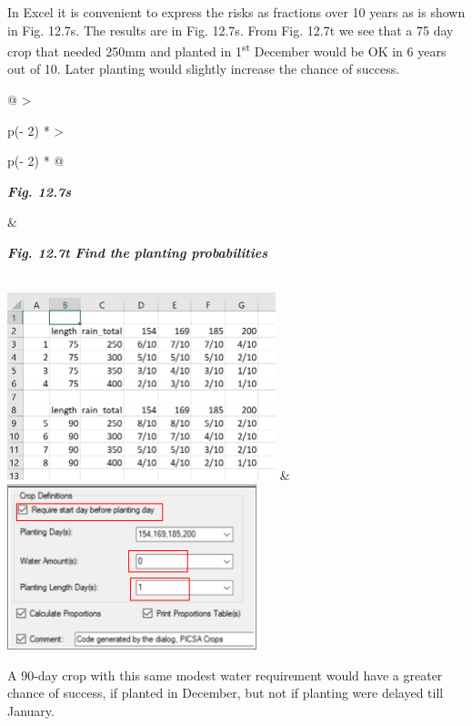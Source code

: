 \documentclass[
  letterpaper,
  DIV=11,
  numbers=noendperiod]{scrreprt}
\begin{document}
In Excel it is convenient to express the risks as fractions over 10
years as is shown in Fig. 12.7s. The results are in Fig. 12.7s. From
Fig. 12.7t we see that a 75 day crop that needed 250mm and planted in
1\textsuperscript{st} December would be OK in 6 years out of 10. Later
planting would slightly increase the chance of success.

\begin{longtable}[]{@{}
  >{\raggedright\arraybackslash}p{(\columnwidth - 2\tabcolsep) * }
  >{\raggedright\arraybackslash}p{(\columnwidth - 2\tabcolsep) * }@{}}
\toprule\noalign{}
\begin{minipage}[b]{\linewidth}\raggedright
\textbf{\emph{Fig. 12.7s}}
\end{minipage} & \begin{minipage}[b]{\linewidth}\raggedright
\textbf{\emph{Fig. 12.7t Find the planting probabilities}}
\end{minipage} \\
\midrule\noalign{}
\endhead
\bottomrule\noalign{}
\endlastfoot
\includegraphics[width=3.07458in,height=2.14494in]{figures/Fig12.7s.png}
&
\includegraphics[width=2.8573in,height=1.89192in]{figures/Fig12.7t.png} \\
\end{longtable}

A 90-day crop with this same modest water requirement would have a
greater chance of success, if planted in December, but not if planting
were delayed till January.
\end{document}
